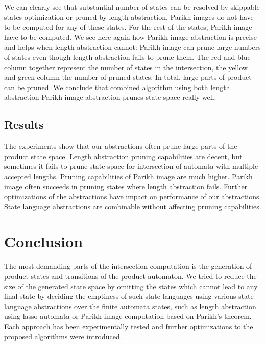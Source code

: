 We can clearly see that substantial number of states can be resolved by skippable states optimization or pruned by length abstraction. Parikh images do not have to be computed for any of these states. For the rest of the states, Parikh image have to be computed. We see here again how Parikh image abstraction is precise and helps when length abstraction cannot: Parikh image can prune large numbers of states even though length abstraction fails to prune them. The red and blue column together represent the number of states in the intersection, the yellow and green column the number of pruned states. In total, large parts of product can be pruned. We conclude that combined algorithm using both length abstraction Parikh image abstraction prunes state space really well.

\section{Results}


The experiments show that our abstractions often prune large parts of the product state space. Length abstraction pruning capabilities are decent, but sometimes it fails to prune state space for intersection of automata with multiple accepted lengths. Pruning capabilities of Parikh image are much higher. Parikh image often succeeds in pruning states where length abstraction fails. Further optimizations of the abstractions have impact on performance of our abstractions. State language abstractions are combinable without affecting pruning capabilities.

\chapter{Conclusion}

The most demanding parts of the intersection computation is the generation of product states and transitions of the product automaton. We tried to reduce the size of the generated state space by omitting the states which cannot lead to any final state by deciding the emptiness of such state languages using various state language abstractions over the finite automata states, such as length abstraction using lasso automata or Parikh image computation based on Parikh's theorem. Each approach has been experimentally tested and further optimizations to the proposed algorithms were introduced.

